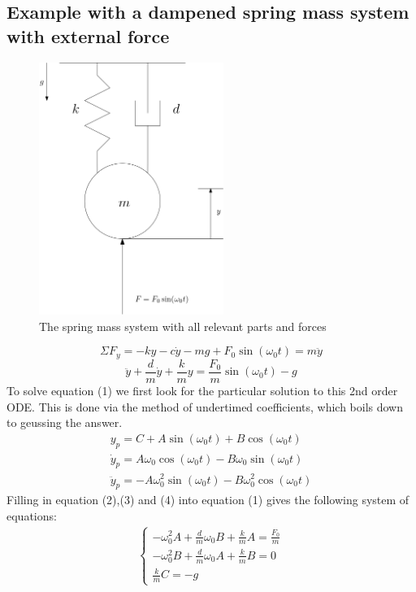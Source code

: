 \documentclass[11pt, a4paper]{article}
\begin{document}
\subsection{Example with a dampened spring mass system with external force}
\begin{figure}[h]
  \centerline{\includegraphics[width=60mm]{images/SpringMass.png}}
  \caption{The spring mass system with all relevant parts and forces}
\end{figure}
\begin{equation*}
  \Sigma F_y = -ky -c\dot{y} -mg + F_0\sin(\omega_0t) = m\ddot{y}
\end{equation*}
\begin{equation}
  \ddot{y} + \frac{d}{m} \dot{y} + \frac{k}{m}y = \frac{F_0}{m}\sin(\omega_0t) - g
\end{equation}
To solve equation (1) we first look for the particular solution to this 2nd order ODE.
This is done via the method of undertimed coefficients, which boils down to geussing the answer.
\begin{gather}
  y_p = C + A\sin(\omega_0t) + B\cos(\omega_0t)\\
  \dot{y}_p = A\omega_0\cos(\omega_0t) - B\omega_0\sin(\omega_0t)\\
  \ddot{y}_p = -A\omega_0^2\sin(\omega_0t) - B\omega_{0}^2\cos(\omega_0t)
\end{gather}
Filling in equation (2),(3) and (4) into equation (1) gives the following
system of equations:
\begin{align}
  \begin{cases}
    -\omega_0^2A + \frac{d}{m}\omega_0B + \frac{k}{m}A = \frac{F_0}{m}\\
    -\omega_0^2B + \frac{d}{m}\omega_0A + \frac{k}{m}B = 0\\
    \frac{k}{m}C = -g
  \end{cases}
\end{align}
\end{document}
